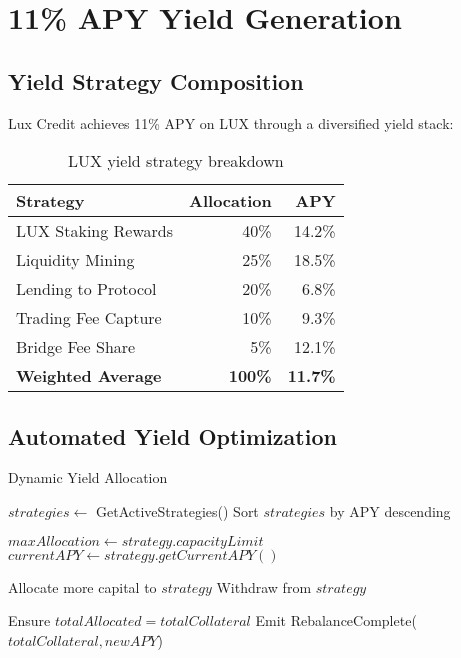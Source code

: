 \documentclass[11pt,a4paper]{article}
\begin{document}
\section{11\% APY Yield Generation}

\subsection{Yield Strategy Composition}

Lux Credit achieves 11\% APY on LUX through a diversified yield stack:

\begin{table}[h]
\centering
\begin{tabular}{@{}lrr@{}}
\toprule
\textbf{Strategy} & \textbf{Allocation} & \textbf{APY} \\ \midrule
LUX Staking Rewards & 40\% & 14.2\% \\
Liquidity Mining & 25\% & 18.5\% \\
Lending to Protocol & 20\% & 6.8\% \\
Trading Fee Capture & 10\% & 9.3\% \\
Bridge Fee Share & 5\% & 12.1\% \\ \midrule
\textbf{Weighted Average} & \textbf{100\%} & \textbf{11.7\%} \\ \bottomrule
\end{tabular}
\caption{LUX yield strategy breakdown}
\end{table}

\subsection{Automated Yield Optimization}

\begin{algorithm}[H]
\caption{Dynamic Yield Allocation}
\begin{algorithmic}[1]
    \State $strategies \gets$ GetActiveStrategies()
    \State Sort $strategies$ by APY descending
    
        \State $maxAllocation \gets strategy.capacityLimit$
        \State $currentAPY \gets strategy.getCurrentAPY()$
        
            \State Allocate more capital to $strategy$
            \State Withdraw from $strategy$
        \EndIf
    \EndFor
    
    \State Ensure $totalAllocated = totalCollateral$
    \State Emit RebalanceComplete($totalCollateral, newAPY$)
\EndFunction
\end{algorithmic}
\end{algorithm}
\end{document}
